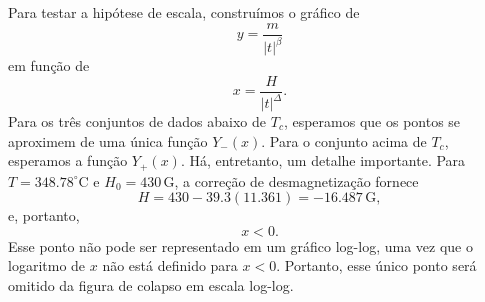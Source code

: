\documentclass[11pt,a4paper]{article}
\begin{document}
%
Para testar a hipótese de escala, construímos o gráfico de
%
\begin{equation}
    y=\frac{m}{|t|^\beta}
\end{equation}
%
em função de
%
\begin{equation}
    x=\frac{H}{|t|^\Delta}.
\end{equation}
%
Para os três conjuntos de dados abaixo de $T_c$, esperamos que os
pontos se aproximem de uma única função $Y_-(x)$. Para o conjunto acima
de $T_c$, esperamos a função $Y_+(x)$. Há, entretanto, um detalhe importante. Para
$T=348.78^\circ\mathrm C$ e $H_0=430\,\mathrm G$, a correção de
desmagnetização fornece
%
\begin{equation}
    H
    =
    430-39.3(11.361)
    =
    -16.487\,\mathrm G,
\end{equation}
%
e, portanto,
%
\begin{equation}
    x<0.
\end{equation}
%
Esse ponto não pode ser representado em um gráfico log-log, uma vez que
o logaritmo de $x$ não está definido para $x<0$. Portanto, esse único
ponto será omitido da figura de colapso em escala log-log.
%
\end{document}
